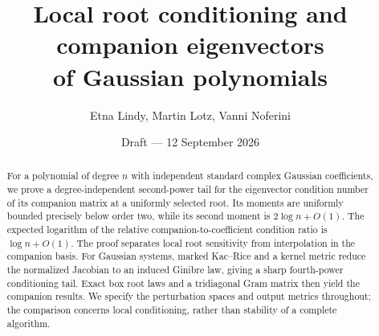 \documentclass[11pt]{article}
\title{Local root conditioning and companion eigenvectors\\
of Gaussian polynomials}
\author{Etna Lindy, Martin Lotz, Vanni Noferini}
\date{Draft --- 12 September 2026}
\theoremstyle{definition}
\theoremstyle{remark}
\begin{document}
\maketitle
\begin{abstract}
For a polynomial of degree $n$ with independent standard complex Gaussian
coefficients, we prove a degree-independent second-power tail for the
eigenvector condition number of its companion matrix at a uniformly selected
root. Its moments are uniformly bounded precisely below order two, while its
second moment is $2\log n+O(1)$. The expected logarithm of the relative
companion-to-coefficient condition ratio is $\log n+O(1)$. The proof separates
local root sensitivity from interpolation in the companion basis. For Gaussian
systems, marked Kac--Rice and a kernel metric reduce the normalized Jacobian
to an induced Ginibre law, giving a sharp fourth-power conditioning tail.
Exact box root laws and a tridiagonal Gram matrix then yield the companion
results. We specify the perturbation spaces and output metrics throughout;
the comparison concerns local conditioning, rather than stability of a
complete algorithm.
\end{abstract}










\end{document}

